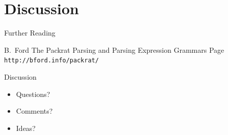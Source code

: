 \documentclass{beamer}
\begin{document}
\section{Discussion}
\begin{frame}{Further Reading}
  \begin{thebibliography}{a}
    \beamertemplateonlinebibitems
      B.~Ford
      \newblock The Packrat Parsing and Parsing Expression Grammars
      Page
      \newblock \texttt{http://bford.info/packrat/}
  \end{thebibliography}
\end{frame}


\begin{frame}{Discussion}
  \begin{itemize}
  \item Questions?
  \item Comments?
  \item Ideas?
  \end{itemize}
\end{frame}
\end{document}
